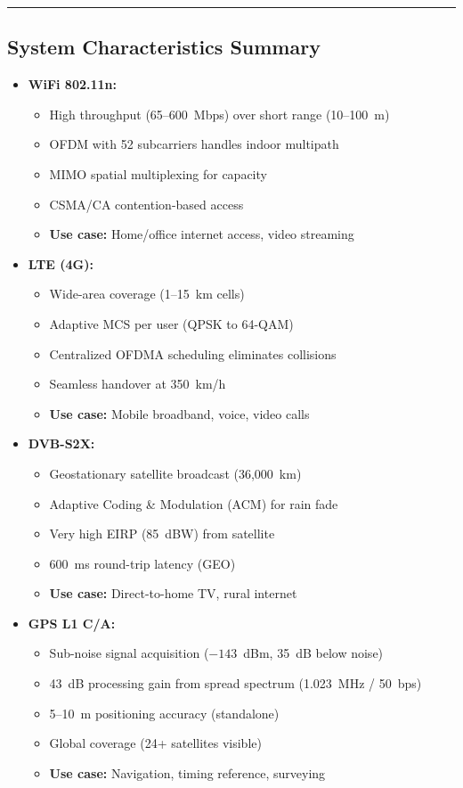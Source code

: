 \begin{center}\rule{0.5\linewidth}{0.5pt}\end{center}

\subsection{System Characteristics Summary}

\begin{itemize}
\item \textbf{WiFi 802.11n:}
  \begin{itemize}
  \item High throughput (65--600~Mbps) over short range (10--100~m)
  \item OFDM with 52 subcarriers handles indoor multipath
  \item MIMO spatial multiplexing for capacity
  \item CSMA/CA contention-based access
  \item \textbf{Use case:} Home/office internet access, video streaming
  \end{itemize}

\item \textbf{LTE (4G):}
  \begin{itemize}
  \item Wide-area coverage (1--15~km cells)
  \item Adaptive MCS per user (QPSK to 64-QAM)
  \item Centralized OFDMA scheduling eliminates collisions
  \item Seamless handover at 350~km/h
  \item \textbf{Use case:} Mobile broadband, voice, video calls
  \end{itemize}

\item \textbf{DVB-S2X:}
  \begin{itemize}
  \item Geostationary satellite broadcast (36,000~km)
  \item Adaptive Coding \& Modulation (ACM) for rain fade
  \item Very high EIRP (85~dBW) from satellite
  \item 600~ms round-trip latency (GEO)
  \item \textbf{Use case:} Direct-to-home TV, rural internet
  \end{itemize}

\item \textbf{GPS L1 C/A:}
  \begin{itemize}
  \item Sub-noise signal acquisition ($-143$~dBm, 35~dB below noise)
  \item 43~dB processing gain from spread spectrum (1.023~MHz / 50~bps)
  \item 5--10~m positioning accuracy (standalone)
  \item Global coverage (24+ satellites visible)
  \item \textbf{Use case:} Navigation, timing reference, surveying
  \end{itemize}


\end{itemize}
